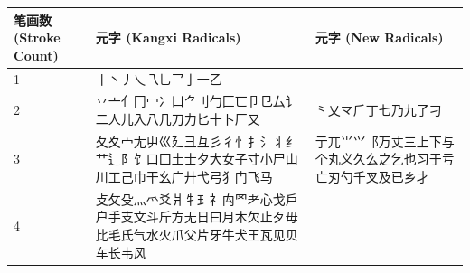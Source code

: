 \begin{longtable}[]{@{}lll@{}}
\toprule
\begin{minipage}[b]{0.30\columnwidth}\raggedright
笔画数 (Stroke Count)\strut
\end{minipage} & \begin{minipage}[b]{0.30\columnwidth}\raggedright
元字 (Kangxi Radicals)\strut
\end{minipage} & \begin{minipage}[b]{0.30\columnwidth}\raggedright
元字 (New Radicals)\strut
\end{minipage}\tabularnewline
\midrule
\endhead
\begin{minipage}[t]{0.30\columnwidth}\raggedright
1\strut
\end{minipage} & \begin{minipage}[t]{0.30\columnwidth}\raggedright
丨丶丿乀乁乚乛亅一乙\strut
\end{minipage} & \begin{minipage}[t]{0.30\columnwidth}\raggedright
\strut
\end{minipage}\tabularnewline
\begin{minipage}[t]{0.30\columnwidth}\raggedright
2\strut
\end{minipage} & \begin{minipage}[t]{0.30\columnwidth}\raggedright
丷亠亻冂冖冫凵⺈刂勹匚匸卩㔾厶讠二人儿入八几刀力匕十卜厂又\strut
\end{minipage} & \begin{minipage}[t]{0.30\columnwidth}\raggedright
⺀乂龴⺁丁七乃九了刁\strut
\end{minipage}\tabularnewline
\begin{minipage}[t]{0.30\columnwidth}\raggedright
3\strut
\end{minipage} & \begin{minipage}[t]{0.30\columnwidth}\raggedright
夂夊宀尢屮巛廴彐彑彡彳忄扌氵丬纟艹辶阝饣口囗土士夕大女子寸小尸山川工己巾干幺广廾弋弓犭门飞马\strut
\end{minipage} & \begin{minipage}[t]{0.30\columnwidth}\raggedright
亍兀⺌⺍⻏万丈三上下与个丸义久么之乞也习于亏亡刃勺千叉及已乡才\strut
\end{minipage}\tabularnewline
\begin{minipage}[t]{0.30\columnwidth}\raggedright
4\strut
\end{minipage} & \begin{minipage}[t]{0.30\columnwidth}\raggedright
攴攵殳灬爫爻爿牜⺩礻禸罓耂心戈戶户手支文斗斤方无日曰月木欠止歹毋比毛氏气水火爪父片牙牛犬王瓦见贝车长韦风\strut

\end{minipage}
\end{longtable}
